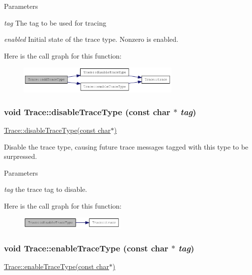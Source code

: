 \begin{DoxyParams}{Parameters}
\item[{\em tag}]The tag to be used for tracing \item[{\em enabled}]Initial state of the trace type. Nonzero is enabled. \end{DoxyParams}


Here is the call graph for this function:\nopagebreak
\begin{figure}[H]
\begin{center}
\leavevmode
\includegraphics[width=226pt]{classTrace_a307942e3b0179af28fb7a7a0868fe4b1_cgraph}
\end{center}
\end{figure}
\hypertarget{classTrace_ace78e6fb4da6fc7cb85ec4ee5421c148}{
\subsubsection[{disableTraceType}]{\setlength{\rightskip}{0pt plus 5cm}void Trace::disableTraceType (const char $\ast$ {\em tag})}}
\label{classTrace_ace78e6fb4da6fc7cb85ec4ee5421c148}
\hyperlink{classTrace_ace78e6fb4da6fc7cb85ec4ee5421c148}{Trace::disableTraceType(const char$\ast$)}

Disable the trace type, causing future trace messages tagged with this type to be surpressed.


\begin{DoxyParams}{Parameters}
\item[{\em tag}]the trace tag to disable. \end{DoxyParams}


Here is the call graph for this function:\nopagebreak
\begin{figure}[H]
\begin{center}
\leavevmode
\includegraphics[width=148pt]{classTrace_ace78e6fb4da6fc7cb85ec4ee5421c148_cgraph}
\end{center}
\end{figure}
\hypertarget{classTrace_aba8fd6ff6e39496ca25050ae01800523}{
\subsubsection[{enableTraceType}]{\setlength{\rightskip}{0pt plus 5cm}void Trace::enableTraceType (const char $\ast$ {\em tag})}}
\label{classTrace_aba8fd6ff6e39496ca25050ae01800523}
\hyperlink{classTrace_aba8fd6ff6e39496ca25050ae01800523}{Trace::enableTraceType(const char$\ast$)}

